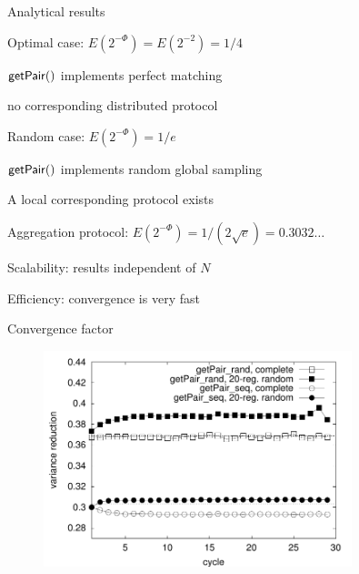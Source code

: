\begin{frame}{Analytical results}
\BIL
\item \alert{Optimal case}: $E(2^{-\Phi}) = E(2^{-2}) = 1/4$
\BI
\item $\mathsf{getPair}()$ implements perfect matching
\item no corresponding distributed protocol
\EI
\item \alert{Random case}: $E(2^{-\Phi}) = 1/e$
\BI
\item $\mathsf{getPair}()$ implements random global sampling
\item A local corresponding protocol exists
\EI
\item \alert{Aggregation protocol}: $E(2^{-\Phi}) = 1/(2\sqrt{e}) = 0.3032\ldots$ 
\BI
\item Scalability: results independent of $N$
\item Efficiency: convergence is very fast
\EI
\EIL

\end{frame}

\begin{frame}{Convergence factor}

\begin{figure}
	\includegraphics[width=0.80\textwidth]{figs/11/rate-100000}
\end{figure}

\end{frame}


